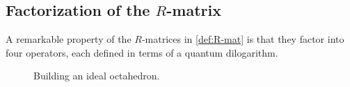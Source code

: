 \documentclass{sl2ams}
\numberwithin{equation}{section}
\begin{document}
\subsection{Factorization of the \texorpdfstring{\(R\)}{R}-matrix}
\label{sec:factorization}

A remarkable property of the \(R\)-matrices in \cref{def:R-mat} is that they factor into four operators, each defined in terms of a quantum dilogarithm.

\begin{figure}
  \centering
  \hfill
  \hfill
  \hfill
  \caption{Building an ideal octahedron.}
  \label{fig:build-ideal-octahedron}
\end{figure}
\end{document}
